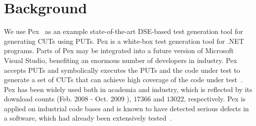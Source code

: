 \section{Background}
\label{sec:background}

We use Pex~\cite{pex:rel} as an example state-of-the-art DSE-based test generation tool for generating CUTs using PUTs. Pex is a white-box test generation tool for .NET programs. Parts of Pex may be integrated into a future version of Microsoft Visual Studio, benefiting an enormous number of developers in industry. Pex accepts PUTs and symbolically executes the PUTs and the code under test to generate a set of CUTs that can achieve high coverage of the code under test~\cite{king:symex}. Pex has been widely used both in academia and industry, which is reflected by its download counts (Feb. 2008 - Oct. 2009 ), $17366$ and $13022$, respectively. Pex is applied on industrial code bases and is known to have detected serious defects in a software, which had already been extensively tested~\cite{tillmann08:pex}. 